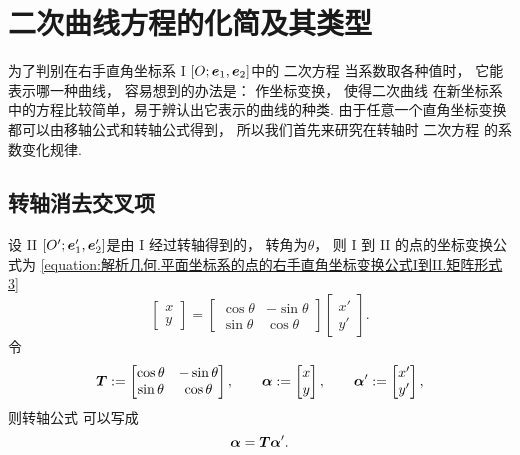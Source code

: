 \section{二次曲线方程的化简及其类型}
为了判别在右手直角坐标系 I \([O;\boldsymbol{e}_1,\boldsymbol{e}_2]\)中的
二次方程 
当系数取各种值时，
它能表示哪一种曲线，
容易想到的办法是：
作坐标变换，
使得二次曲线 
在新坐标系中的方程比较简单，易于辨认出它表示的曲线的种类.
由于任意一个直角坐标变换都可以由移轴公式和转轴公式得到，
所以我们首先来研究在转轴时
二次方程  的系数变化规律.

\subsection{转轴消去交叉项}
设 II \([O';\boldsymbol{e}_1',\boldsymbol{e}_2']\)是由 I 经过转轴得到的，
转角为\(\theta\)，
则 I 到 II 的点的坐标变换公式为
\cref{equation:解析几何.平面坐标系的点的右手直角坐标变换公式I到II.矩阵形式3}
\begin{equation}
	\begin{bmatrix}
		x \\ y
	\end{bmatrix}
	= \begin{bmatrix}
		\cos\theta & -\sin\theta \\
		\sin\theta & \cos\theta
	\end{bmatrix}
	\begin{bmatrix}
		x' \\ y'
	\end{bmatrix}.
\end{equation}
令\begin{equation*}
	\boldsymbol{T} := \begin{bmatrix}
		\cos\theta & -\sin\theta \\
		\sin\theta & \cos\theta
	\end{bmatrix},
	\qquad
	\boldsymbol\alpha := \begin{bmatrix}
		x \\ y
	\end{bmatrix},
	\qquad
	\boldsymbol\alpha' := \begin{bmatrix}
		x' \\ y'
	\end{bmatrix},
\end{equation*}
则转轴公式 
可以写成\begin{equation*}
	\boldsymbol\alpha = \boldsymbol{T} \boldsymbol\alpha'.
\end{equation*}

